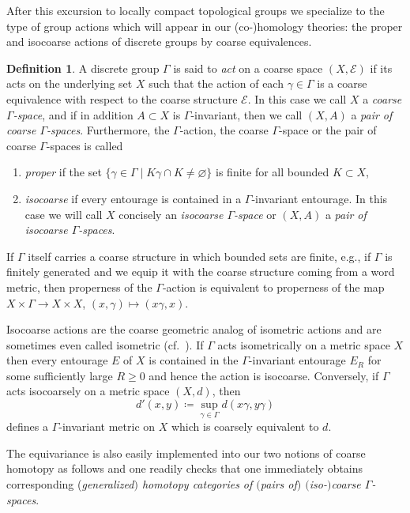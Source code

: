 \documentclass[pdftex]{sigma}
\numberwithin{equation}{section}
\theoremstyle{definition}
\newtheorem{defn}[thm]{Definition}
\newcommand{\coarseStr}{\mathcal{E}}
\begin{document}
After this excursion to locally compact topological groups we specialize to the type of group actions which will appear in our \mbox{(co-)}homology theories: the proper and isocoarse actions of discrete groups by coarse equivalences.

\begin{defn}\label{def:discretegroupactingoncoarsespace}
A discrete group $\Gamma$ is said to \emph{act} on a coarse space $(X,\coarseStr)$ if its acts on the underlying set $X$ such that the action of each $\gamma\in\Gamma$ is a coarse equivalence with respect to the coarse structure $\coarseStr$. In this case we call $X$ a \emph{coarse $\Gamma$-space}, and if in addition $A\subset X$ is $\Gamma$-invariant, then we call $(X,A)$ a \emph{pair of coarse $\Gamma$-spaces}.
Furthermore, the $\Gamma$-action, the coarse $\Gamma$-space or the pair of coarse $\Gamma$-spaces is called
\begin{enumerate}\itemsep=0pt
\item[$\bullet$] \emph{proper} if the set $\{\gamma\in \Gamma\mid K\gamma \cap K\not=\varnothing\}$ is finite for all bounded $K\subset X$,
\item[$\bullet$] \emph{isocoarse} if every entourage is contained in a $\Gamma$-invariant entourage. In this case we will call $X$ concisely an \emph{isocoarse $\Gamma$-space} or $(X,A)$ a \emph{pair of isocoarse $\Gamma$-spaces}.
\end{enumerate}
\end{defn}

If $\Gamma$ itself carries a coarse structure in which bounded sets are finite, e.g., if $\Gamma$ is finitely generated and we equip it with the coarse structure coming from a word metric, then properness of the $\Gamma$-action is equivalent to properness of the map $X\times \Gamma\to X\times X$, $(x,\gamma)\mapsto (x\gamma,x)$.

Isocoarse actions are the coarse geometric analog of isometric actions and are sometimes even called isometric (cf.\ \cite[Definition 1]{EmeMeyDescent}). If $\Gamma$ acts isometrically on a metric space $X$ then every entourage $E$ of $X$ is contained in the $\Gamma$-invariant entourage $E_R$ for some sufficiently large $R\geq 0$
and hence the action is isocoarse. Conversely, if $\Gamma$ acts isocoarsely on a metric space $(X,d)$, then
\[
d'(x,y)\coloneqq\sup_{\gamma\in\Gamma}d(x\gamma,y\gamma)
\]
defines a $\Gamma$-invariant metric on $X$ which is coarsely equivalent to $d$.


The equivariance is also easily implemented into our two notions of coarse homotopy as follows and one readily checks that one immediately obtains corresponding (\emph{generalized$)$ homotopy categories of $($pairs of$)$ $($iso-$)$coarse $\Gamma$-spaces}.
\end{document}
